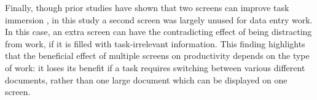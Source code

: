 Finally, though prior studies have shown that two screens can improve task immersion \citep{Bi2009}, in this study a second screen was largely unused for data entry work. In this case, an extra screen can have the contradicting effect of being distracting from work, if it is filled with task-irrelevant information. This finding highlights that the beneficial effect of multiple screens on productivity depends on the type of work: it loses its benefit if a task requires switching between various different documents, rather than one large document which can be displayed on one screen.

